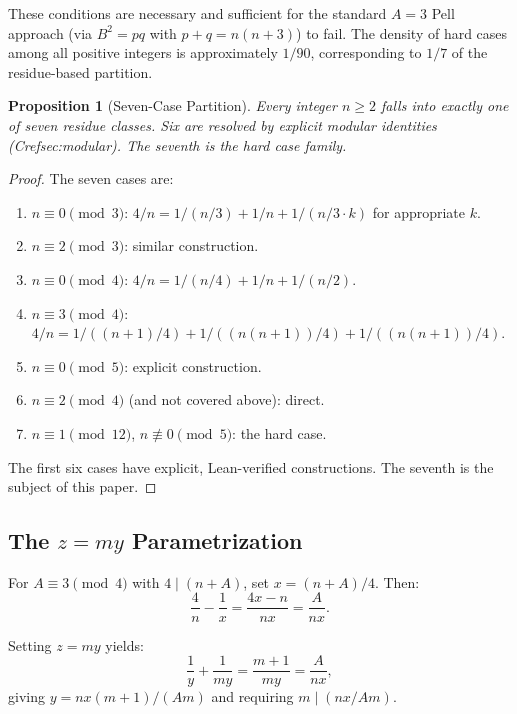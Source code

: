 \documentclass[11pt,a4paper]{article}
\theoremstyle{plain}
\newtheorem{proposition}[theorem]{Proposition}
\theoremstyle{plain}
\theoremstyle{definition}
\numberwithin{equation}{section}
\begin{document}
These conditions are necessary and sufficient for the standard $A = 3$ Pell approach (via $B^2 = pq$ with $p + q = n(n+3)$) to fail. The density of hard cases among all positive integers is approximately $1/90$, corresponding to $1/7$ of the residue-based partition.

\begin{proposition}[Seven-Case Partition]\label{prop:partition}
Every integer $n \geq 2$ falls into exactly one of seven residue classes. Six are resolved by explicit modular identities (Cref{sec:modular}). The seventh is the hard case family.
\end{proposition}

\begin{proof}
The seven cases are:
\begin{enumerate}[noitemsep]
  \item $n \equiv 0 \pmod{3}$: $4/n = 1/(n/3) + 1/n + 1/(n/3 \cdot k)$ for appropriate $k$.
  \item $n \equiv 2 \pmod{3}$: similar construction.
  \item $n \equiv 0 \pmod{4}$: $4/n = 1/(n/4) + 1/n + 1/(n/2)$.
  \item $n \equiv 3 \pmod{4}$: $4/n = 1/((n+1)/4) + 1/((n(n+1))/4) + 1/((n(n+1))/4)$.
  \item $n \equiv 0 \pmod{5}$: explicit construction.
  \item $n \equiv 2 \pmod{4}$ (and not covered above): direct.
  \item $n \equiv 1 \pmod{12}$, $n \not\equiv 0 \pmod{5}$: the hard case.
\end{enumerate}
The first six cases have explicit, Lean-verified constructions. The seventh is the subject of this paper.
\end{proof}

\subsection{The $z = my$ Parametrization}

For $A \equiv 3 \pmod{4}$ with $4 \mid (n + A)$, set $x = (n+A)/4$. Then:
\begin{equation}
\frac{4}{n} - \frac{1}{x} = \frac{4x - n}{nx} = \frac{A}{nx}.
\end{equation}

Setting $z = my$ yields:
\begin{equation}
\frac{1}{y} + \frac{1}{my} = \frac{m+1}{my} = \frac{A}{nx},
\end{equation}
giving $y = nx(m+1)/(Am)$ and requiring $m \mid (nx/Am)$.
\end{document}
